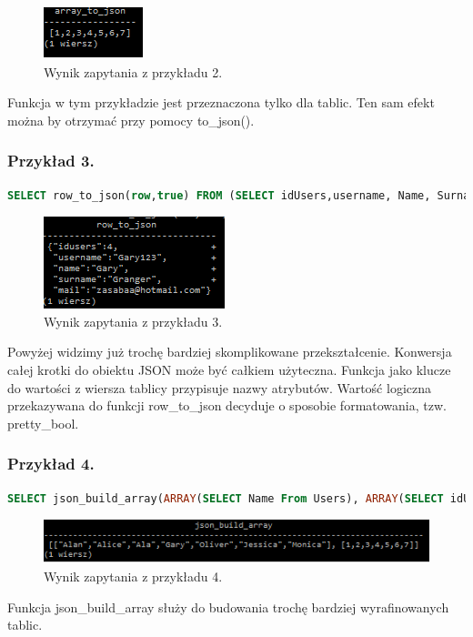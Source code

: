 \documentclass[a4paper,12pt,table]{article}
\begin{document}
{\begin{figure}[h]
\begin{center}
\includegraphics[scale=1]{sc/43}
\end{center}
\caption{Wynik zapytania z przykładu 2.}
\end{figure}%
Funkcja w tym przykładzie jest przeznaczona tylko dla tablic. Ten sam efekt można by otrzymać przy pomocy to\_json().

\subsubsection*{Przykład 3.}
\begin{lstlisting}[language=SQL,basicstyle=\footnotesize]
SELECT row_to_json(row,true) FROM (SELECT idUsers,username, Name, Surname, mail FROM Users WHERE idUsers=4) row;
\end{lstlisting}
\vspace{0.5cm}
\begin{figure}[h]
\begin{center}
\includegraphics[scale=1]{sc/44}
\end{center}
\caption{Wynik zapytania z przykładu 3.}

\end{figure}%
Powyżej widzimy już trochę bardziej skomplikowane przekształcenie. Konwersja całej krotki do obiektu JSON może być całkiem użyteczna. Funkcja jako klucze do wartości z wiersza tablicy przypisuje nazwy atrybutów. Wartość logiczna przekazywana do funkcji row\_to\_json decyduje o sposobie formatowania, tzw. pretty\_bool.


\subsubsection*{Przykład 4.}
\begin{lstlisting}[language=SQL,basicstyle=\footnotesize]
SELECT json_build_array(ARRAY(SELECT Name From Users), ARRAY(SELECT idUsers From Users));
\end{lstlisting}
\vspace{0.5cm}
\begin{figure}[h]
\begin{center}
\includegraphics[scale=1]{sc/45}
\end{center}
\caption{Wynik zapytania z przykładu 4.}
\end{figure}%
Funkcja json\_build\_array służy do budowania trochę bardziej wyrafinowanych tablic.

}
\end{document}
